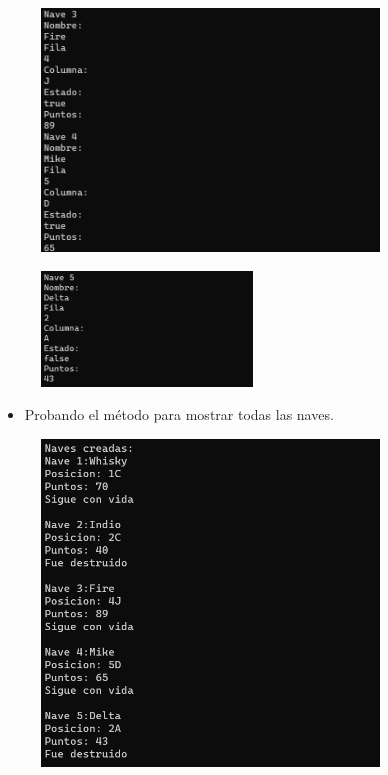 \documentclass{article}
\begin{document}
	\begin{figure}[H]
		\centering
	\includegraphics[width=0.8\textwidth,keepaspectratio]{img/captura2.png}
	\end{figure}
	
	\begin{figure}[H]
		\centering
	\includegraphics[width=0.5\textwidth,keepaspectratio]{img/captura3.png}
	\end{figure}
	
	\begin{itemize}
		\item Probando el método para mostrar todas las naves.
	\end{itemize}
	\begin{figure}[H]
		\centering
	\includegraphics[width=0.8\textwidth,keepaspectratio]{img/captura4.png}
	\end{figure}
	
\end{document}
